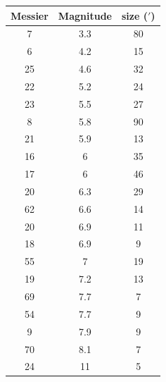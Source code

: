 \begin{center}
\begin{tabular}{ccc}
Messier & Magnitude & size ($'$) \\
\hline
7 & 3.3 & 80 \\
6 & 4.2 & 15 \\
25 & 4.6 & 32 \\
22 & 5.2 & 24 \\
23 & 5.5 & 27 \\
8 & 5.8 & 90 \\
21 & 5.9 & 13 \\
16 & 6 & 35 \\
17 & 6 & 46 \\
20 & 6.3 & 29 \\
62 & 6.6 & 14 \\
20 & 6.9 & 11 \\ %
18 & 6.9 & 9 \\
55 & 7 & 19 \\
19 & 7.2 & 13 \\
69 & 7.7 & 7 \\
54 & 7.7 & 9 \\
9 & 7.9 & 9 \\
70 & 8.1 & 7 \\
24 & 11 & 5 \\ %
\end{tabular}
\end{center}
